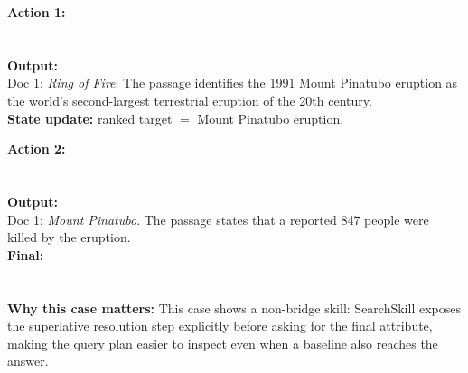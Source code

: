 \documentclass{article}
\begin{document}
\textbf{Action 1:}\\
\\
\\
\textbf{Output:}\\
Doc 1: \emph{Ring of Fire}. The passage identifies the 1991 Mount Pinatubo eruption as the world's second-largest terrestrial eruption of the 20th century.\\
\textbf{State update:} ranked target \(=\) Mount Pinatubo eruption.

\textbf{Action 2:}\\
\\
\\
\textbf{Output:}\\
Doc 1: \emph{Mount Pinatubo}. The passage states that a reported 847 people were killed by the eruption.\\
\textbf{Final:}\\
\\
\\
\textbf{Why this case matters:} This case shows a non-bridge skill: SearchSkill exposes the superlative resolution step explicitly before asking for the final attribute, making the query plan easier to inspect even when a baseline also reaches the answer.
\casehr
\end{document}

